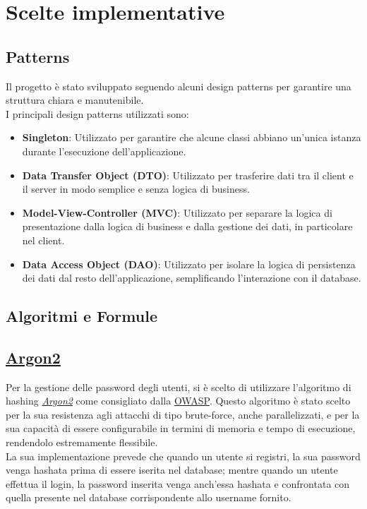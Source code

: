 \section{Scelte implementative}

\subsection{Patterns}
Il progetto è stato sviluppato seguendo alcuni design patterns
per garantire una struttura chiara e manutenibile.\\
I principali
design patterns utilizzati sono:
\begin{itemize}
    \item \textbf{Singleton}: Utilizzato per garantire che alcune 
    classi abbiano un'unica istanza durante l'esecuzione dell'applicazione.
    \item \textbf{Data Transfer Object (DTO)}: Utilizzato per
    trasferire dati tra il client e il server in modo semplice e
    senza logica di business.
    \item \textbf{Model-View-Controller (MVC)}: Utilizzato per
    separare la logica di presentazione dalla logica di business
    e dalla gestione dei dati, in particolare nel client.
    \item \textbf{Data Access Object (DAO)}: Utilizzato per isolare
    la logica di persistenza dei dati dal resto dell'applicazione,
    semplificando l'interazione con il database.
\end{itemize}

\subsection{Algoritmi e Formule}

\subsection{\href{https://github.com/p-h-c/phc-winner-argon2}{Argon2}}
Per la gestione delle password degli utenti, si è scelto di utilizzare
l'algoritmo di hashing \href{https://github.com/p-h-c/phc-winner-argon2}{\textit{Argon2}} come consigliato dalla
\href{https://owasp.org}{OWASP}.
Questo algoritmo è stato scelto per la sua resistenza agli attacchi 
di tipo brute-force, anche parallelizzati, e per la sua capacità di essere configurabile
in termini di memoria e tempo di esecuzione, rendendolo estremamente flessibile.\\
La sua implementazione prevede che quando un utente si registri, 
la sua password venga hashata prima di essere iserita nel database;
mentre quando un utente effettua il login, la password inserita
venga anch'essa hashata e confrontata con quella presente nel database
corrispondente allo username fornito.

